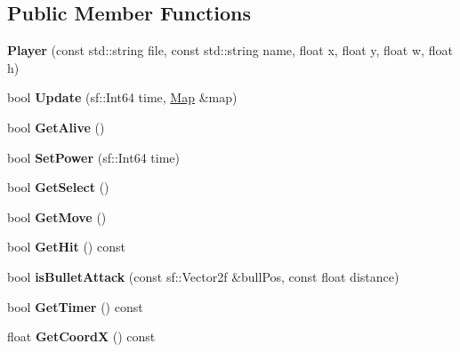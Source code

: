 \subsection*{Public Member Functions}
\begin{DoxyCompactItemize}
\item 
\mbox{\label{class_player_abafd446ede2e1a770374fa14bdb0a4e7}} 
{\bfseries Player} (const std\+::string file, const std\+::string name, float x, float y, float w, float h)
\item 
\mbox{\label{class_player_af5852c410ca00fd6e0f1df220ebd7252}} 
bool {\bfseries Update} (sf\+::\+Int64 time, \hyperlink{class_map}{Map} \&map)
\item 
\mbox{\label{class_player_a9ee7c669f1a11cf8e4b05c100450e2b7}} 
bool {\bfseries Get\+Alive} ()
\item 
\mbox{\label{class_player_ae5f85a02134fc92697c7fdba20c642f5}} 
bool {\bfseries Set\+Power} (sf\+::\+Int64 time)
\item 
\mbox{\label{class_player_a54a908f0d556cb9de705e6084454c15a}} 
bool {\bfseries Get\+Select} ()
\item 
\mbox{\label{class_player_a960f09a55c9150be442a9b8c151179d3}} 
bool {\bfseries Get\+Move} ()
\item 
\mbox{\label{class_player_a41f4db3d836b71b355d84a0cb4317361}} 
bool {\bfseries Get\+Hit} () const
\item 
\mbox{\label{class_player_a741d3f60b6957c7907b7d7007be642e7}} 
bool {\bfseries is\+Bullet\+Attack} (const sf\+::\+Vector2f \&bull\+Pos, const float distance)
\item 
\mbox{\label{class_player_af0e6ea79c8e1d2f5994f6c79f2d158bb}} 
bool {\bfseries Get\+Timer} () const
\item 
\mbox{\label{class_player_aa572817a620dedc98ff4634152b12b97}} 
float {\bfseries Get\+CoordX} () const
\item 
\mbox{\label{class_player_afe3678c701d5ed81f0c1729a3265b6b3}} 

\end{DoxyCompactItemize}
